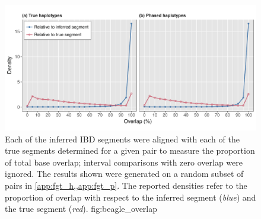 

\begin{figure}[!htb]
\includegraphics[width=\textwidth]{./img/ch3/beagle_overlap}
{Each of the inferred IBD segments were aligned with each of the true segments determined for a given pair to measure the proportion of total base overlap; interval comparisons with zero overlap were ignored.
The results shown were generated on a random subset of  pairs in \cref{app:fgt_h,,app:fgt_p}.
The reported densities refer to the proportion of overlap with respect to the inferred segment (\emph{blue}) and the true segment (\emph{red}).}
{fig:beagle_overlap}
\end{figure}
